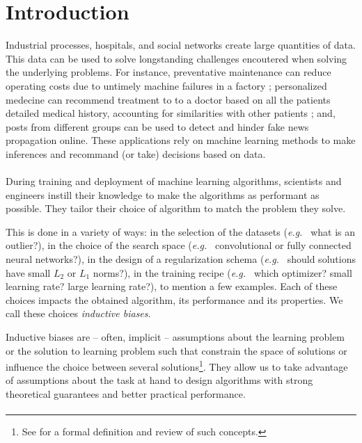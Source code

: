 
\section{Introduction}
Industrial processes, hospitals, and social networks create large quantities of data.
This data can be used to solve longstanding challenges encoutered when solving the underlying problems. For instance, preventative maintenance can reduce operating costs due to untimely machine failures in a factory ; personalized medecine can recommend treatment to to a doctor based on all the patients detailed medical history, accounting for similarities with other patients ; and, posts from different groups can be used to detect and hinder fake news propagation online. These applications rely on machine learning methods to make inferences and recommand (or take) decisions based on data.


\paragraph{}
During training and deployment of machine learning algorithms, scientists and engineers instill their knowledge to make the algorithms as performant as possible. They tailor their choice of algorithm to match the problem they solve.

This is done in a variety of ways: in the selection of the datasets (\emph{e.g.\ } what is an outlier?), in the choice of the search space (\emph{e.g.\ } convolutional or fully connected neural networks?), in the design of a regularization schema (\emph{e.g.\ } should solutions have small $L_2$ or $L_1$ norms?), in the training recipe (\emph{e.g.\ } which optimizer? small learning rate? large learning rate?), to mention a few examples. Each of these choices impacts the obtained algorithm, its performance and its properties. We call these choices \emph{inductive biases}.

Inductive biases are -- often, implicit -- assumptions about the learning problem or the solution to learning problem such that constrain the space of solutions or influence the choice between several solutions\footnote{See \cite{mitchell-inductive,1806.01261} for a formal definition and review of such concepts.}. They allow us to take advantage of assumptions about the task at hand to design algorithms with strong theoretical guarantees and better practical performance.

\paragraph{}

